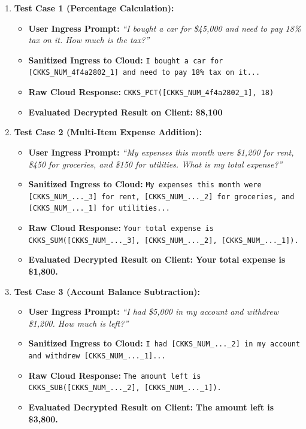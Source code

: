 \begin{enumerate}[leftmargin=*]
    \item \textbf{Test Case 1 (Percentage Calculation):}
    \begin{itemize}
        \item \textbf{User Ingress Prompt:} \textit{``I bought a car for \$45,000 and need to pay 18\% tax on it. How much is the tax?''}
        \item \textbf{Sanitized Ingress to Cloud:} \texttt{I bought a car for [CKKS\_NUM\_4f4a2802\_1] and need to pay 18\% tax on it...}
        \item \textbf{Raw Cloud Response:} \texttt{CKKS\_PCT([CKKS\_NUM\_4f4a2802\_1], 18)}
        \item \textbf{Evaluated Decrypted Result on Client:} \textbf{\$8,100}
    \end{itemize}
    \item \textbf{Test Case 2 (Multi-Item Expense Addition):}
    \begin{itemize}
        \item \textbf{User Ingress Prompt:} \textit{``My expenses this month were \$1,200 for rent, \$450 for groceries, and \$150 for utilities. What is my total expense?''}
        \item \textbf{Sanitized Ingress to Cloud:} \texttt{My expenses this month were [CKKS\_NUM\_...\_3] for rent, [CKKS\_NUM\_...\_2] for groceries, and [CKKS\_NUM\_...\_1] for utilities...}
        \item \textbf{Raw Cloud Response:} \texttt{Your total expense is CKKS\_SUM([CKKS\_NUM\_...\_3], [CKKS\_NUM\_...\_2], [CKKS\_NUM\_...\_1]).}
        \item \textbf{Evaluated Decrypted Result on Client:} \textbf{Your total expense is \$1,800.}
    \end{itemize}
    \item \textbf{Test Case 3 (Account Balance Subtraction):}
    \begin{itemize}
        \item \textbf{User Ingress Prompt:} \textit{``I had \$5,000 in my account and withdrew \$1,200. How much is left?''}
        \item \textbf{Sanitized Ingress to Cloud:} \texttt{I had [CKKS\_NUM\_...\_2] in my account and withdrew [CKKS\_NUM\_...\_1]...}
        \item \textbf{Raw Cloud Response:} \texttt{The amount left is CKKS\_SUB([CKKS\_NUM\_...\_2], [CKKS\_NUM\_...\_1]).}
        \item \textbf{Evaluated Decrypted Result on Client:} \textbf{The amount left is \$3,800.}
    \end{itemize}
\end{enumerate}

